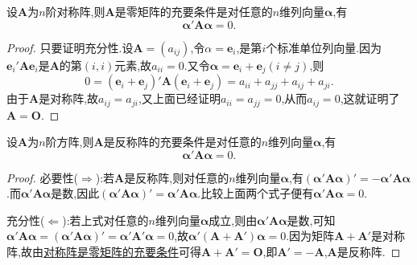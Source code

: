 \documentclass[../../main.tex]{subfiles}%
\begin{document}
\begin{proposition}[对称阵是零矩阵的充要条件]\label{proposition:对称阵是零矩阵的充要条件}
设\(\boldsymbol{A}\)为\(n\)阶对称阵,则\(\boldsymbol{A}\)是零矩阵的充要条件是对任意的\(n\)维列向量\(\boldsymbol{\alpha}\),有
\[
\boldsymbol{\alpha'} \boldsymbol{A} \boldsymbol{\alpha} = 0.
\]
\end{proposition}
\begin{proof}
只要证明充分性.设\(\boldsymbol{A}=(a_{ij})\),令\(\alpha = \boldsymbol{e}_{i}\),是第\(i\)个标准单位列向量.因为\(\boldsymbol{e}_{i}'\boldsymbol{A}\boldsymbol{e}_{i}\)是\(\boldsymbol{A}\)的第\((i, i)\)元素,故\(a_{ii}=0\).又令\(\boldsymbol{\alpha}=\boldsymbol{e}_{i}+\boldsymbol{e}_{j}(i \neq j)\),则
\[
0 = (\boldsymbol{e}_{i}+\boldsymbol{e}_{j})'\boldsymbol{A}(\boldsymbol{e}_{i}+\boldsymbol{e}_{j})=a_{ii}+a_{jj}+a_{ij}+a_{ji}.
\]
由于\(\boldsymbol{A}\)是对称阵,故\(a_{ij}=a_{ji}\),又上面已经证明\(a_{ii}=a_{jj}=0\),从而\(a_{ij}=0\),这就证明了\(\boldsymbol{A} = \boldsymbol{O}\).
\end{proof}

\begin{proposition}[反对称阵的充要条件]\label{proposition:反对称阵的刻画}
设\(\boldsymbol{A}\)为\(n\)阶方阵,则\(\boldsymbol{A}\)是反称阵的充要条件是对任意的\(n\)维列向量\(\boldsymbol{\alpha}\),有
\[
\boldsymbol{\alpha'} \boldsymbol{A} \boldsymbol{\alpha} = 0.
\]
\end{proposition}
\begin{proof}

必要性($\Rightarrow $):若\(\boldsymbol{A}\)是反称阵,则对任意的\(n\)维列向量\(\boldsymbol{\alpha}\),有\((\boldsymbol{\alpha' A \alpha})' = - \boldsymbol{\alpha' A \alpha}\).而\(\boldsymbol{\alpha' A \alpha}\)是数,因此\((\boldsymbol{\alpha' A \alpha})' = \boldsymbol{\alpha' A \alpha}\).比较上面两个式子便有\(\boldsymbol{\alpha' A \alpha} = 0\).

充分性($\Leftarrow $):若上式对任意的\(n\)维列向量\(\boldsymbol{\alpha}\)成立,则由\(\boldsymbol{\alpha' A \alpha}\)是数,可知$\boldsymbol{\alpha }'\boldsymbol{A\alpha }=\left( \boldsymbol{\alpha }'\boldsymbol{A\alpha } \right) '=\boldsymbol{\alpha }'\boldsymbol{A}'\boldsymbol{\alpha }=0$,故\(\boldsymbol{\alpha'}(\boldsymbol{A} + \boldsymbol{A'})\boldsymbol{\alpha} = 0\).因为矩阵\(\boldsymbol{A} + \boldsymbol{A'}\)是对称阵,故由\hyperref[proposition:对称阵是零矩阵的充要条件]{对称阵是零矩阵的充要条件}可得\(\boldsymbol{A} + \boldsymbol{A'} = \boldsymbol{O}\),即\(\boldsymbol{A'} = - \boldsymbol{A}\),\(\boldsymbol{A}\)是反称阵.
\end{proof}
\end{document}
